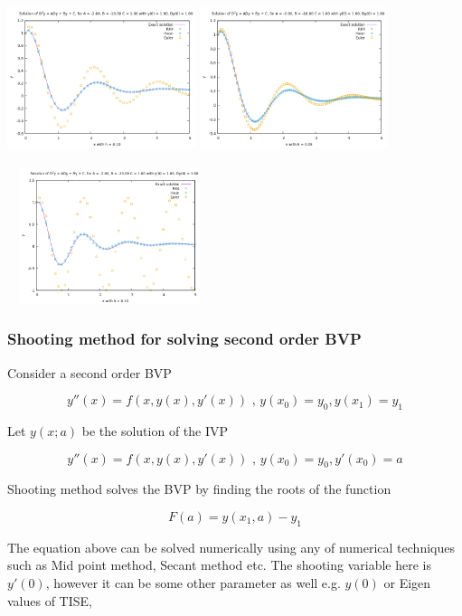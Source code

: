 \documentclass{beamer}
\begin{document}
\begin{frame}

\begin{center}
	\includegraphics[width = 5.5cm , height = 5cm ]{2.png}
	\includegraphics[width = 5.5cm , height = 5cm ]{1.png}\\
    \includegraphics[width = 6cm , height = 4cm ]{3.png}
\end{center}
\end{frame}

\begin{frame}
	\frametitle{Shooting method for solving second order BVP}
	
	Consider a second order BVP 
	
	\begin{equation}
	y''(x) = f(x, y(x), y'(x) ) \text{     ,    } y(x_0) = y_0, y(x_1) = y_1
	\end{equation}
	
	Let $y(x;a)$ be the solution of the IVP 
	
	\begin{equation}
	y''(x) = f(x, y(x), y'(x) ) \text{     ,    } y(x_0) = y_0, y'(x_0) = a	
	\end{equation}
	
	Shooting method solves the BVP by finding the roots of the function 
	
	\begin{equation}
	F(a) = y(x_1, a) - y_1 
	\end{equation}
	
	The equation above can be solved numerically using any of numerical techniques such as Mid point method, Secant method etc. The shooting variable here is $y'(0)$, however it can be some other parameter as well e.g. $y(0)$ or Eigen values of TISE, 
	
\end{frame}
\end{document}
